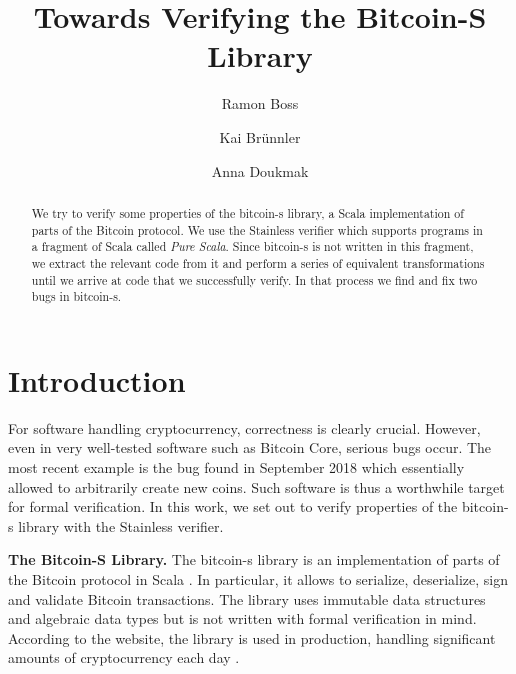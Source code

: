 \documentclass[runningheads]{llncs}
\renewcommand{\paragraph}{\textbf}%
\begin{document}
\title{Towards Verifying the Bitcoin-S Library}

\author{Ramon Boss \and Kai Brünnler \and Anna Doukmak}


\maketitle             

\begin{abstract}
  We try to verify some properties of the bitcoin-s library, a Scala
  implementation of parts of the Bitcoin protocol. We use the
  Stainless verifier which supports programs in a fragment of Scala
  called \emph{Pure Scala}.  Since bitcoin-s is not written in this
  fragment, we extract the relevant code from it and perform a series
  of equivalent transformations until we arrive at code that we
  successfully verify. In that process we find and fix two bugs in
  bitcoin-s.

\end{abstract}



\section{Introduction}

For software handling cryptocurrency, correctness is clearly crucial.
However, even in very well-tested software such as Bitcoin Core,
serious bugs occur. The most recent example is the bug found in
September 2018 \cite{cve201817144} which essentially allowed to
arbitrarily create new coins. Such software is thus a worthwhile
target for formal verification. In this work, we set out to verify
properties of the bitcoin-s library with the Stainless verifier.

\paragraph{The Bitcoin-S Library.} The bitcoin-s library is an
implementation of parts of the Bitcoin protocol in Scala
\cite{BitcoinS:website,BitcoinS:github}. In particular, it allows to
serialize, deserialize, sign and validate Bitcoin transactions. The library
uses immutable data structures and algebraic data types but is not
written with formal verification in mind. According to the website,
the library is used in production, handling significant amounts of
cryptocurrency each day \cite{BitcoinS:website}.
\end{document}
